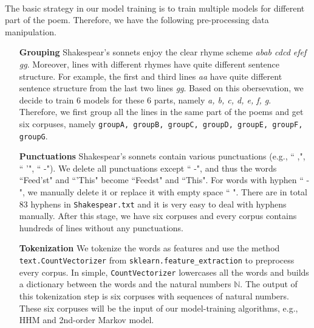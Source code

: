 %
\paragraph{}
The basic strategy in our model training is to train multiple models for different part of the poem. Therefore, we have the following pre-processing data manipulation.

\begin{enumerate}
	\item [\textbf{Grouping}] Shakespear's sonnets enjoy the clear rhyme scheme \textit{abab cdcd efef gg}. Moreover, lines with different rhymes have quite different sentence structure. For example, the first and third lines \textit{aa} have quite different sentence structure from the last two lines \textit{gg}. Based on this obersevation, we decide to train 6 models for these 6 parts, namely \textit{a, b, c, d, e, f, g}. Therefore, we first group all the lines in the same part of the poems and get six corpuses, namely \texttt{groupA, groupB, groupC, groupD, groupE, groupF, groupG}.
	\item [\textbf{Punctuations}] Shakespear's sonnets contain various punctuations (e.g., `` ,", `` '", `` -"). We delete all punctuations except `` -", and thus the words ``Feed'st" and ``'This" become ``Feedst" and ``This". For words with hyphen `` -", we manually delete it or replace it with empty space ``  ". There are in total 83 hyphens in \texttt{Shakespear.txt} and it is very easy to deal with hyphens manually. After this stage, we have six corpuses and every corpus contains hundreds of lines without any punctuations.
	\item [\textbf{Tokenization}] We tokenize the words as features and use the method \texttt{text.CountVectorizer} from \texttt{sklearn.feature\_extraction} to preprocess every corpus. In simple, \texttt{CountVectorizer} lowercases all the words and builds a dictionary between the words and the natural numbers $\mathbb{N}$. The output of this tokenization step is six corpuses with sequences of natural numbers. These six corpuses will be the input of our model-training algorithms, e.g., HHM and 2nd-order Markov model.
\end{enumerate}

